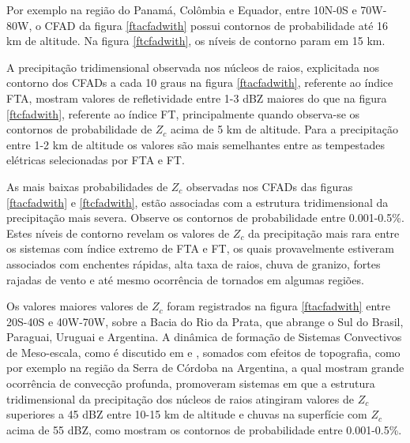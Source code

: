 Por exemplo na região do Panamá, Colômbia e Equador, entre 10N-0S e 70W-80W, o CFAD da figura \ref{ftacfadwith} possui contornos de probabilidade até 16 km de altitude. Na figura \ref{ftcfadwith}, os níveis de contorno param em 15 km.

A precipitação tridimensional observada nos núcleos de raios, explicitada nos contorno dos CFADs a cada 10 graus na figura \ref{ftacfadwith}, referente ao índice FTA, mostram valores de refletividade entre 1-3 dBZ maiores do que na figura \ref{ftcfadwith}, referente ao índice FT, principalmente quando observa-se os contornos de probabilidade de $Z_c$ acima de 5 km de altitude. Para a precipitação entre 1-2 km de altitude os valores são mais semelhantes entre as tempestades elétricas selecionadas por FTA e FT. 


As mais baixas probabilidades de $Z_c$ observadas nos CFADs das figuras \ref{ftacfadwith} e \ref{ftcfadwith}, estão associadas com a estrutura tridimensional da precipitação mais severa. Observe os contornos de probabilidade entre 0.001-0.5\%. Estes níveis de contorno revelam os valores de $Z_c$ da precipitação mais rara entre os sistemas com índice extremo de FTA e FT, os quais provavelmente estiveram associados com enchentes rápidas, alta taxa de raios, chuva de granizo, fortes rajadas de vento e até mesmo ocorrência de tornados em algumas regiões. 

Os valores maiores valores de $Z_c$ foram registrados na figura \ref{ftacfadwith} entre 20S-40S e 40W-70W, sobre a Bacia do Rio da Prata, que abrange o Sul do Brasil, Paraguai, Uruguai e Argentina. A dinâmica de formação de Sistemas Convectivos de Meso-escala, como é discutido em \cite{Velasco1987} e \cite{Durkee2009}, somados com efeitos de topografia, como por exemplo na região da Serra de Córdoba na Argentina, a qual \cite{Rasmussen2011} mostram grande ocorrência de convecção profunda, promoveram sistemas em que a estrutura tridimensional da precipitação dos núcleos de raios atingiram valores de $Z_c$ superiores a 45 dBZ entre 10-15 km de altitude e chuvas na superfície com $Z_c$ acima de 55 dBZ, como mostram os contornos de probabilidade entre 0.001-0.5\%.

